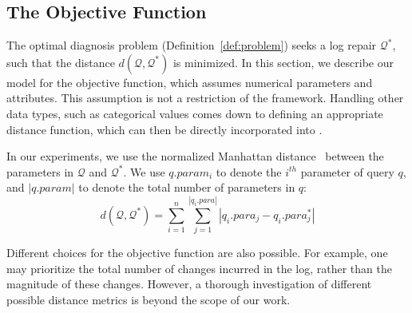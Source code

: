 
\subsection{The Objective Function}

The optimal diagnosis problem (Definition~\ref{def:problem}) seeks a
log repair $\mathcal{Q}^*$, such that the distance
$d(\mathcal{Q},\mathcal{Q}^*)$ is minimized. In this section, we
describe our model for the objective function, which assumes numerical
parameters and attributes. This assumption is not a restriction of the
\sys framework.
Handling other data types, such as categorical values comes down to defining an appropriate distance function, which can then be directly incorporated into \sys.

In our experiments, we use the normalized Manhattan
distance~\cite{manhattan} between the parameters in $\mathcal{Q}$ and
$\mathcal{Q}^*$. We use $q.param_i$ to denote the $i^{th}$ parameter
of query $q$, and $|q.param|$ to denote the total number of parameters
in $q$: \[d(\mathcal{Q}, \mathcal{Q}^*) = \sum_{i = 1} ^{n} \sum_{j =
1}^{|q_i.para|} |q_i.para_j - q_i.para_j^*|\]

Different choices for the objective function are also possible. For
example, one may prioritize the total number of changes incurred in
the log, rather than the magnitude of these changes. However, a
thorough investigation of different possible distance metrics is
beyond the scope of our work.

